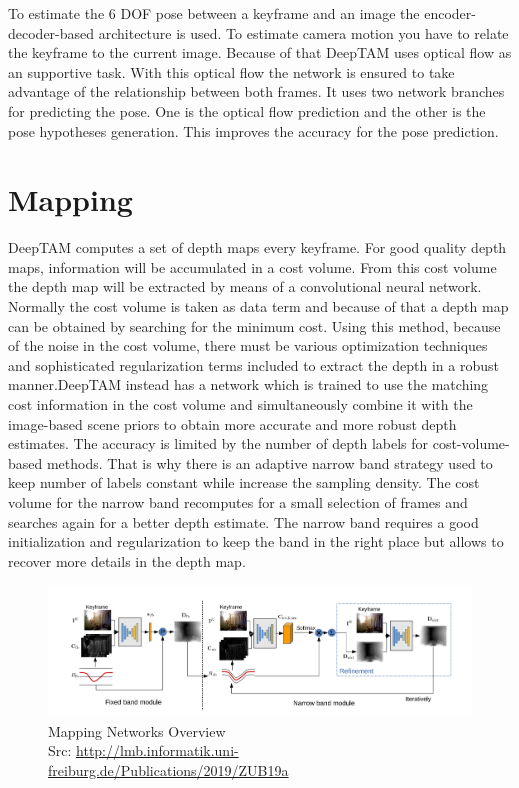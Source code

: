 To estimate the 6 DOF pose between a keyframe and an image the encoder-decoder-based architecture is used. To estimate camera motion you have to relate the keyframe to the current image. Because of that DeepTAM uses optical flow as an supportive task. With this optical flow the network is ensured to take advantage of the relationship between both frames. It uses two network branches for predicting the pose. One is the optical flow prediction and the other is the pose hypotheses generation. This improves the accuracy for the pose prediction.

\section{Mapping}

DeepTAM computes a set of depth maps every keyframe. For good quality depth maps, information will be accumulated in a cost volume. From this cost volume the depth map will be extracted by means of a convolutional neural network.
\newline
\newline
Normally the cost volume is taken as data term and because of that a depth map can be obtained by searching for the minimum cost. Using this method, because of the noise in the cost volume, there must be various optimization techniques and sophisticated regularization terms included to extract the depth in a robust manner.DeepTAM instead has a network which is trained to use the matching cost information in the cost volume and simultaneously combine it with the image-based scene priors to obtain more accurate and more robust depth estimates. 
\newline
\newline
The accuracy is limited by the number of depth labels for cost-volume-based methods. That is why there is an adaptive narrow band strategy used to keep number of labels constant while increase the sampling density. The cost volume for the narrow band recomputes for a small selection of frames and searches again for a better depth estimate. The narrow band requires a good initialization and regularization to keep the band in the right place but allows to recover more details in the depth map.

\begin{figure}[h]
	\centering
	\includegraphics[width=1.1\textwidth]{./media/images/DeepTAM-Mapping.PNG}
  	\caption{Mapping Networks Overview
  	\\Src: \url{http://lmb.informatik.uni-freiburg.de/Publications/2019/ZUB19a}}
  	\label{DeepTAM-Mapping}
\end{figure}

